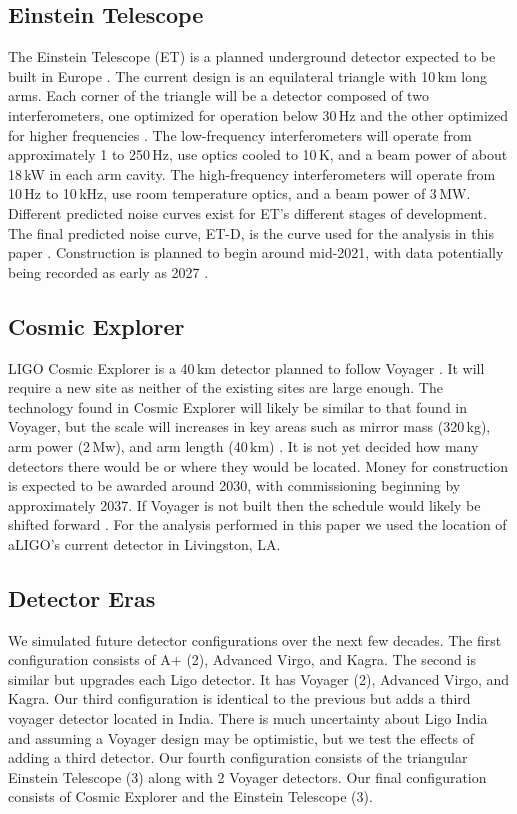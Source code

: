\documentclass[letterpaper, aps, prd, twocolumn, superscriptaddress, showpacs, nofootinbib]{revtex4}
\begin{document}
\subsection{Einstein Telescope}

The Einstein Telescope (ET) is a planned underground detector expected to be built in Europe \cite{0264-9381-27-19-194002}. The current design is an equilateral triangle with 10\,km long arms. Each corner of the triangle will be a detector composed of two interferometers, one optimized for operation below 30\,Hz and the other optimized for higher frequencies \cite{ET:design}. The low-frequency interferometers will operate from approximately 1 to 250\,Hz, use optics cooled to 10\,K, and a beam power of about 18\,kW in each arm cavity. The high-frequency interferometers will operate from 10\,Hz to 10\,kHz, use room temperature optics, and a beam power of 3\,MW. Different predicted noise curves exist for ET's different stages of development. The final predicted noise curve, ET-D, is the curve used for the analysis in this paper \cite{ET:design}. Construction is planned to begin around mid-2021, with data potentially being recorded as early as 2027 \cite{ET:design, whitepaper2018}.

\subsection{Cosmic Explorer}

LIGO Cosmic Explorer is a 40\,km detector planned to follow Voyager \cite{2017CQGra..34d4001A}. It will require a new site as neither of the existing sites are large enough. The technology found in Cosmic Explorer will likely be similar to that found in Voyager, but the scale will increases in key areas such as mirror mass (320\,kg), arm power (2\,Mw), and arm length (40\,km) \cite{whitepaper2018}. It is not yet decided how many detectors there would be or where they would be located. Money for construction is expected to be awarded around 2030, with commissioning beginning by approximately 2037. If Voyager is not built then the schedule would likely be shifted forward \cite{whitepaper2018}. For the analysis performed in this paper we used the location of aLIGO's current detector in Livingston, LA.

\subsection{Detector Eras}
\label{subsec:eras}

We simulated future detector configurations over the next few decades. The first configuration consists of A+ (2), Advanced Virgo, and Kagra. The second is similar but upgrades each Ligo detector. It has Voyager (2), Advanced Virgo, and Kagra. Our third configuration is identical to the previous but adds a third voyager detector located in India. There is much uncertainty about Ligo India and assuming a Voyager design may be optimistic, but we test the effects of adding a third detector. Our fourth configuration consists of the triangular Einstein Telescope (3) along with 2 Voyager detectors. Our final configuration consists of Cosmic Explorer and the Einstein Telescope (3).
\end{document}
